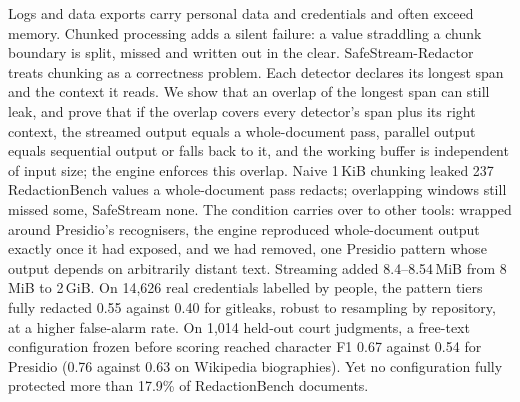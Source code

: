 Logs and data exports carry personal data and credentials and often exceed memory. Chunked processing adds a silent failure: a value straddling a chunk boundary is split, missed and written out in the clear. SafeStream-Redactor treats chunking as a correctness problem. Each detector declares its longest span and the context it reads. We show that an overlap of the longest span can still leak, and prove that if the overlap covers every detector's span plus its right context, the streamed output equals a whole-document pass, parallel output equals sequential output or falls back to it, and the working buffer is independent of input size; the engine enforces this overlap. Naive 1\,KiB chunking leaked 237 RedactionBench values a whole-document pass redacts; overlapping windows still missed some, SafeStream none. The condition carries over to other tools: wrapped around Presidio's recognisers, the engine reproduced whole-document output exactly once it had exposed, and we had removed, one Presidio pattern whose output depends on arbitrarily distant text. Streaming added 8.4--8.54\,MiB from 8\,MiB to 2\,GiB. On 14,626 real credentials labelled by people, the pattern tiers fully redacted 0.55 against 0.40 for gitleaks, robust to resampling by repository, at a higher false-alarm rate. On 1,014 held-out court judgments, a free-text configuration frozen before scoring reached character F1 0.67 against 0.54 for Presidio (0.76 against 0.63 on Wikipedia biographies). Yet no configuration fully protected more than 17.9\% of RedactionBench documents.
